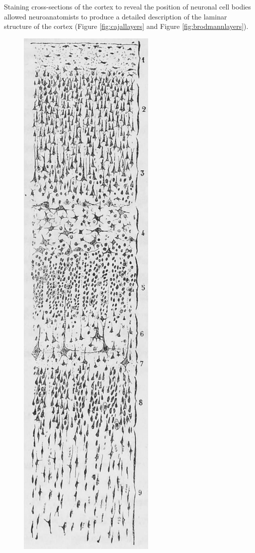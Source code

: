 Staining cross-sections of the cortex to reveal the position of neuronal cell bodies allowed neuroanatomists to produce a detailed description of the laminar structure of the cortex (Figure \ref{fig:cajallayers} and Figure \ref{fig:brodmannlayers}).



\begin{figure}

{\centering \includegraphics[width=0.7\linewidth]{./figures/cns/cajal_shm_fig1} 

}
\end{figure}
